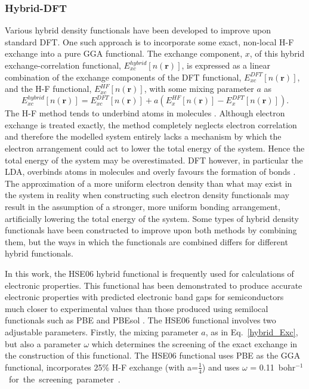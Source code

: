 \documentclass[11pt, twoside]{report}
\begin{document}
\subsubsection{Hybrid-DFT}\label{hse_theory}
Various hybrid density functionals have been developed to improve upon standard DFT. One such approach is to incorporate some exact, non-local H-F exchange into a pure GGA functional. The exchange component, $x$, of this hybrid exchange-correlation functional, $E_{xc}^{hybrid}[n(\boldsymbol{r})]$, is expressed as a linear combination of the exchange components of the DFT functional, $E_{xc}^{DFT}[n(\boldsymbol{r})]$, and the H-F functional, $E_{xc}^{HF}[n(\boldsymbol{r})]$, with some mixing parameter $a$ as
\begin{equation}\label{hybrid_Exc}
E_{xc}^{hybrid}[n(\mathbf{r})] = E_{xc}^{DFT}[n(\mathbf{r})] + a(E_{x}^{HF}[n(\mathbf{r})] - E_{x}^{DFT}[n(\mathbf{r})]) .
\end{equation}
The H-F method tends to underbind atoms in molecules \cite{DFT_delocalisation}. Although electron exchange is treated exactly, the method completely neglects electron correlation and therefore the modelled system entirely lacks a mechanism by which the electron arrangement could act to lower the total energy of the system. Hence the total energy of the system may be overestimated. DFT however, in particular the LDA, overbinds atoms in molecules and overly favours the formation of bonds \cite{DFT_delocalisation}. The approximation of a more uniform electron density than what may exist in the system in reality when constructing such electron density functionals may result in the assumption of a stronger, more uniform bonding arrangement, artificially lowering the total energy of the system. Some types of hybrid density functionals have been constructed to improve upon both methods by combining them, but the ways in which the functionals are combined differs for different hybrid functionals.

In this work, the HSE06 hybrid functional \cite{HSE2} is frequently used for calculations of electronic properties. This functional has been demonstrated to produce accurate electronic properties with predicted electronic band gaps for semiconductors much closer to experimental values than those produced using semilocal functionals such as PBE and PBEsol \cite{HSEsol}.
The HSE06 functional involves two adjustable parameters. Firstly, the mixing parameter $a$, as in Eq.~\ref{hybrid_Exc}, but also a parameter $\omega$ which determines the screening of the exact exchange in the construction of this functional. 
The HSE06 functional uses PBE as the GGA functional, incorporates 25\% H-F exchange (with a=$\frac{1}{4}$) and uses $\omega$ = \SI{0.11}{bohr$^{-1}$} for the screening parameter \cite{HSE2}.
\end{document}
